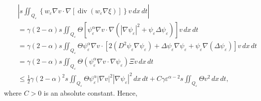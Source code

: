 \documentclass[11pt]{article}
\numberwithin{equation}{section}
\DeclareMathOperator{\Div}{div}
\begin{document}
\begin{eqnarray*}
&&\left|s\iint_{Q_\varepsilon} \left\{w_\varepsilon \nabla v\cdot \nabla [\Div(w_\varepsilon\nabla \xi)]\right\}v\,dx\,dt\right|\\
&&=\gamma(2-\alpha)s\iint_{Q_\varepsilon}\Theta \left[\psi_\varepsilon^\alpha\nabla v\cdot \nabla \left(|\nabla \psi_\varepsilon|^2+\psi_\varepsilon\Delta\psi_\varepsilon\right)\right]v\,dx\,dt\\
&&=\gamma(2-\alpha)s\iint_{Q_\varepsilon}\Theta \psi_\varepsilon^\alpha\nabla v\cdot \left[2(D^2\psi_\varepsilon\nabla \psi_\varepsilon)+\Delta\psi_\varepsilon \nabla \psi_\varepsilon+\psi_\varepsilon\nabla (\Delta \psi_\varepsilon)\right]v\,dx\,dt\\
&&=\gamma(2-\alpha)s\iint_{Q_\varepsilon}\Theta (\psi_\varepsilon^\alpha \nabla v\cdot \nabla\psi_\varepsilon) \Xi v\,dx\,dt\\
&&\leq \frac{1}{2}\gamma (2-\alpha)^2s\iint_{Q_\varepsilon} \Theta \psi_\varepsilon^\alpha |\nabla v|^2|\nabla\psi_\varepsilon|^2\,dx\,dt+C\gamma \varepsilon^{\alpha-2}s\iint_{Q_\varepsilon} \Theta  v^2\,dx\,dt,
\end{eqnarray*}
where $C>0$ is an absolute constant.
Hence,
\end{document}
